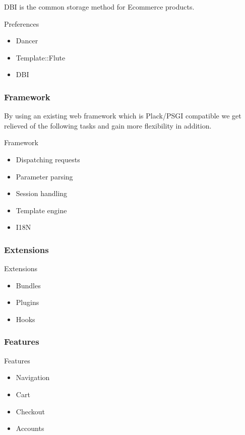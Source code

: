 DBI is the common storage method for Ecommerce products.

\begin{frame}{Preferences}
\begin{itemize}
\item Dancer
\item Template::Flute
\item DBI
\end{itemize}
\end{frame}

\subsubsection{Framework}
By using an existing web framework which is Plack/PSGI compatible
we get relieved of the following
tasks and gain more flexibility in
addition.
 
\begin{frame}{Framework}
\begin{itemize}
\item Dispatching requests
\item Parameter parsing
\item Session handling
\item Template engine
\item I18N
\end{itemize}
\end{frame}

\subsubsection{Extensions}
\begin{frame}{Extensions}
\begin{itemize}
\item Bundles
\item Plugins
\item Hooks
\end{itemize}
\end{frame}

\subsubsection{Features}
\begin{frame}{Features}
\begin{itemize}
\item Navigation
\item Cart
\item Checkout
\item Accounts
\end{itemize}
\end{frame}


